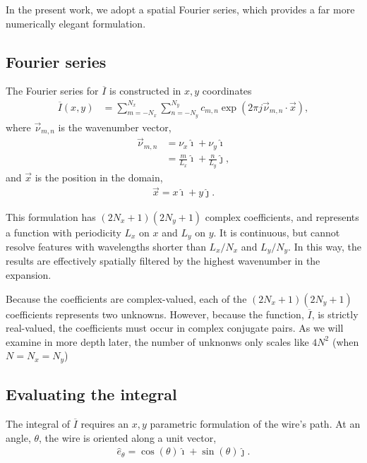 \documentclass{article}
\def\I{\overline{I}}
\def\x{\vec{x}}
\def\vnu{\vec{\nu}_{m,n}}
\def\ui{\hat{\imath}}
\def\uj{\hat{\jmath}}
\begin{document}
In the present work, we adopt a spatial Fourier series, which provides a far more numerically elegant formulation.

\subsection{Fourier series}

The Fourier series for $\I$ is constructed in $x,y$ coordinates
\begin{align}
\I(x,y) &= \sum_{m=-N_x}^{N_x} \sum_{n=-N_y}^{N_y} c_{m,n} \exp\left(2\pi j \vnu \cdot \x \right),\label{eqn:Ibar}
\end{align}
where $\vnu$ is the wavenumber vector,
\begin{align}
\vnu &= \nu_x \ui + \nu_y \ui\nonumber\\
 &=\frac{m}{L_x} \ui + \frac{n}{L_y} \uj,
\end{align}
and $\x$ is the position in the domain,
\begin{align}
\x = x \ui + y \uj.
\end{align}

This formulation has $(2N_x+1)(2N_y+1)$ complex coefficients, and represents a function with periodicity $L_x$ on $x$ and $L_y$ on $y$.  It is continuous, but cannot resolve features with wavelengths shorter than $L_x / N_x$ and $L_y / N_y$.  In this way, the results are effectively spatially filtered by the highest wavenumber in the expansion.

Because the coefficients are complex-valued, each of the $(2N_x+1)(2N_y+1)$ coefficients represents two unknowns.  However, because the function, $\I$, is strictly real-valued, the coefficients must occur in complex conjugate pairs.  As we will examine in more depth later, the number of unknonws only scales like $4N^2$ (when $N = N_x = N_y$)

\subsection{Evaluating the integral}

The integral of $\I$ requires an $x,y$ parametric formulation of the wire's path.  At an angle, $\theta$, the wire is oriented along a unit vector,
\begin{align}
\hat{e}_\theta = \cos(\theta) \ui + \sin(\theta) \uj.
\end{align}
\end{document}
